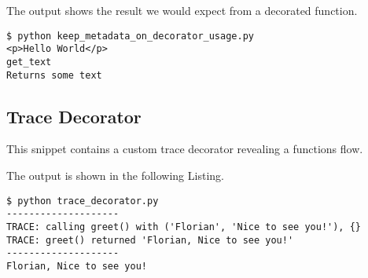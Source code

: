 The output shows the result we would expect from a decorated function.

\begin{lstlisting}[caption=Output of keep\_metadata\_on\_decorator\_usage.py]
$ python keep_metadata_on_decorator_usage.py
<p>Hello World</p>
get_text
Returns some text
\end{lstlisting}


\subsection{Trace Decorator}

This snippet contains a custom trace decorator revealing a functions flow.



The output is shown in the following Listing.

\begin{lstlisting}[caption=Output of trace\_decorator.py]
$ python trace_decorator.py
--------------------
TRACE: calling greet() with ('Florian', 'Nice to see you!'), {}
TRACE: greet() returned 'Florian, Nice to see you!'
--------------------
Florian, Nice to see you!
\end{lstlisting}
